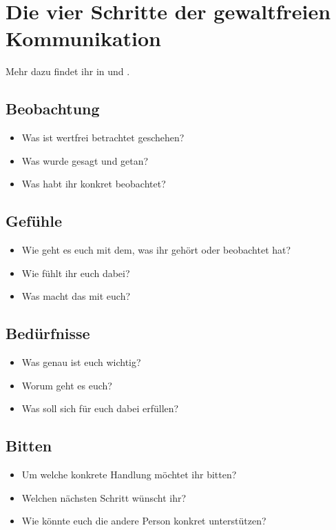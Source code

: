 \section{Die vier Schritte der gewaltfreien Kommunikation}
\label{gfk-schritte}

Mehr dazu findet ihr in \cite[S. 213]{gfk-rosenberg} und \cite{gfk-dummies}.

\subsection{Beobachtung}

\begin{itemize}
 \item Was ist wertfrei betrachtet geschehen?
 \item Was wurde gesagt und getan?
 \item Was habt ihr konkret beobachtet?
\end{itemize}


\subsection{Gefühle}

\begin{itemize}
 \item Wie geht es euch mit dem, was ihr gehört oder beobachtet hat?
 \item Wie fühlt ihr euch dabei?
 \item Was macht das mit euch?
\end{itemize}


\subsection{Bedürfnisse}

\begin{itemize}
 \item Was genau ist euch wichtig?
 \item Worum geht es euch?
 \item Was soll sich für euch dabei erfüllen?
\end{itemize}


\subsection{Bitten}

\begin{itemize}
 \item Um welche konkrete Handlung möchtet ihr bitten?
 \item Welchen nächsten Schritt wünscht ihr?
 \item Wie könnte euch die andere Person konkret unterstützen?
\end{itemize}

